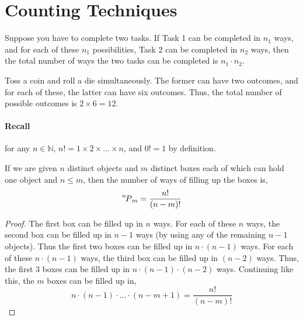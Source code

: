 \section{Counting Techniques}
Suppose you have to complete two tasks. If Task 1 can be completed in $n_1$
ways, and for each of these $n_1$ possibilities, Task 2 can be completed in
$n_2$ ways, then the total number of ways the two tasks can be completed is
$n_1 \cdot n_2$.
\begin{example}
Toss a coin and roll a die simultaneously. The former can have two outcomes,
and for each of these, the latter can have six outcomes. Thus, the total number
of possible outcomes is $2 \times 6 = 12$. 

\paragraph{Recall} for any $n \in \mathbb{N}$, $n! = 1 \times 2 \times
\dots \times n$, and $0! = 1$ by definition. 

\begin{theorem}
    If we are given $n$ distinct objects and $m$ distinct boxes each of which
can hold one object and $n \leq m$, then the number of ways of filling up the
boxes is, 
\begin{equation*}
    \perm[n]{m} = \frac{n!}{(n - m)!}
\end{equation*}
\end{theorem}
\begin{proof}
    The first box can be filled up in $n$ ways. For each of these $n$ ways, the
second box can be filled up in $n - 1$ ways (by using any of the remaining $n
- 1$ objects). Thus the first two boxes can be filled up in $n \cdot (n - 1)$
ways. For each of these $n \cdot (n - 1)$ ways, the third box can be filled up
in $(n - 2)$ ways. Thus, the first $3$ boxes can be filled up in $n \cdot (n -
1) \cdot (n - 2)$ ways. Continuing like this, the $m$ boxes can be filled up
in, 
\begin{equation*}
    n \cdot (n-1) \cdot \dots \cdot (n - m + 1) = \frac{n!}{(n - m)!}
\end{equation*}
\end{proof}
\end{example}
